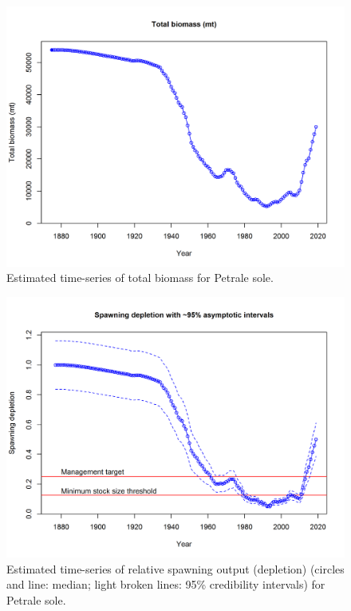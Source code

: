 \documentclass[12pt,]{article}
\begin{document}
\FloatBarrier

\begin{figure}
\centering
\includegraphics{r4ss/plots_mod1/ts1_Total_biomass_(mt).png}
\caption{Estimated time-series of total biomass for Petrale sole.
\label{fig:total_bio}}
\end{figure}

\FloatBarrier

\begin{figure}
\centering
\includegraphics{r4ss/plots_mod1/ts9_Spawning_depletion_with_95_asymptotic_intervals_intervals.png}
\caption{Estimated time-series of relative spawning output (depletion)
(circles and line: median; light broken lines: 95\% credibility
intervals) for Petrale sole. \label{fig:depl}}
\end{figure}
\end{document}

